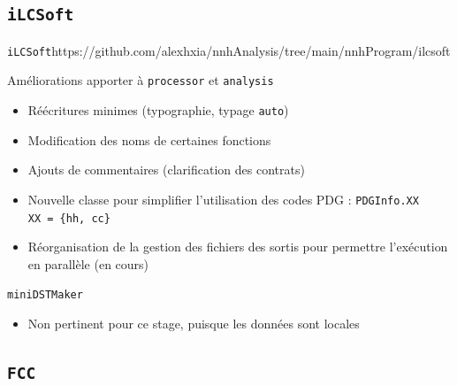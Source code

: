 \documentclass[9pt]{beamer}
\begin{document}
\subsection{\texttt{iLCSoft}}

\begin{frame}{\texttt{iLCSoft}}{https://github.com/alexhxia/nnhAnalysis/tree/main/nnhProgram/ilcsoft}

	\begin{block}{Améliorations apporter à \texttt{processor} et \texttt{analysis}}
		\begin{itemize}
			\item Réécritures minimes (typographie, typage \texttt{auto})
			\item Modification des noms de certaines fonctions
			\item Ajouts de commentaires (clarification des contrats)
			\item Nouvelle classe pour simplifier l'utilisation des codes PDG : \texttt{PDGInfo.XX}\\
					\texttt{XX = \{hh, cc\}}
			\item Réorganisation de la gestion des fichiers des sortis pour permettre l'exécution en parallèle (en cours)
		\end{itemize}
	\end{block}
	
	\begin{block}{\texttt{miniDSTMaker}}
		\begin{itemize}
			\item Non pertinent pour ce stage, puisque les données sont locales
		\end{itemize}
	\end{block}

\end{frame}

\subsection{\texttt{FCC}}
\end{document}
